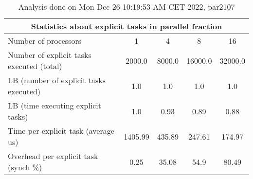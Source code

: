 \begin{table}[h]
\begin{center}
\begin{tabular}{|l|c|c|c|c|}
\hline
\multicolumn{5}{|c|}{Statistics about explicit tasks in parallel fraction} \\
\hline
\hline
Number of processors & 1 & 4 & 8 & 16 \\
\hline
\hline
Number of explicit tasks executed (total)        &          2000.0 &          8000.0 &         16000.0 &         32000.0 \\
\hline
LB (number of explicit tasks executed)           &             1.0 &             1.0 &             1.0 &             1.0 \\
\hline
LB (time executing explicit tasks)               &             1.0 &            0.93 &            0.89 &            0.88 \\
\hline
Time per explicit task (average us)                 &         1405.99 &          435.89 &          247.61 &          174.97 \\
\hline
Overhead per explicit task (synch \%)             &            0.25 &           35.08 &            54.9 &           80.49 \\
\hline
\end{tabular}
\end{center}
\caption{ Analysis done on Mon Dec 26 10:19:53 AM CET 2022, par2107}
\end{table}
